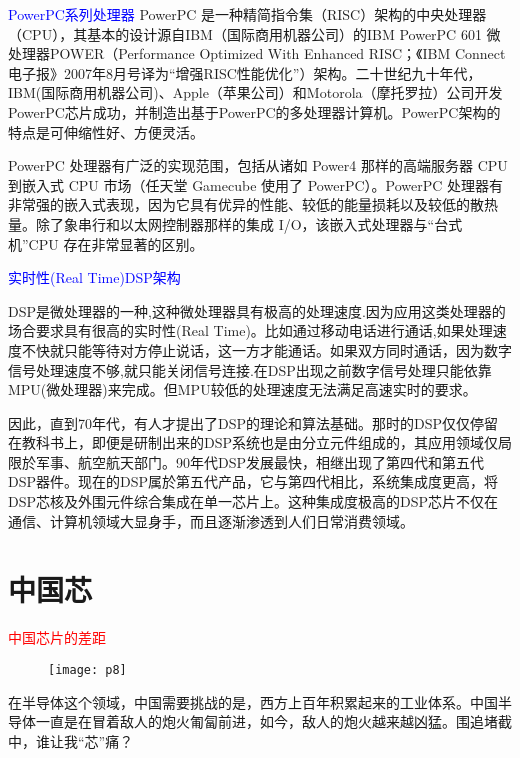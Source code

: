 \documentclass[utf8]{book}
\begin{document}
{\Large \textcolor{blue}{PowerPC系列处理器}}
PowerPC 是一种精简指令集（RISC）架构的中央处理器（CPU），其基本的设计源自IBM（国际商用机器公司）的IBM PowerPC 601 微处理器POWER（Performance Optimized With Enhanced RISC；《IBM Connect 电子报》2007年8月号译为“增强RISC性能优化”）架构。二十世纪九十年代，IBM(国际商用机器公司)、Apple（苹果公司）和Motorola（摩托罗拉）公司开发PowerPC芯片成功，并制造出基于PowerPC的多处理器计算机。PowerPC架构的特点是可伸缩性好、方便灵活。

PowerPC 处理器有广泛的实现范围，包括从诸如 Power4 那样的高端服务器 CPU 到嵌入式 CPU 市场（任天堂 Gamecube 使用了 PowerPC）。PowerPC 处理器有非常强的嵌入式表现，因为它具有优异的性能、较低的能量损耗以及较低的散热量。除了象串行和以太网控制器那样的集成 I/O，该嵌入式处理器与“台式机”CPU 存在非常显著的区别。

{\Large \textcolor{blue}{实时性(Real Time)DSP架构}}

DSP是微处理器的一种,这种微处理器具有极高的处理速度.因为应用这类处理器的场合要求具有很高的实时性(Real Time)。比如通过移动电话进行通话,如果处理速度不快就只能等待对方停止说话，这一方才能通话。如果双方同时通话，因为数字信号处理速度不够,就只能关闭信号连接.在DSP出现之前数字信号处理只能依靠MPU(微处理器)来完成。但MPU较低的处理速度无法满足高速实时的要求。

因此，直到70年代，有人才提出了DSP的理论和算法基础。那时的DSP仅仅停留在教科书上，即便是研制出来的DSP系统也是由分立元件组成的，其应用领域仅局限於军事、航空航天部门。90年代DSP发展最快，相继出现了第四代和第五代DSP器件。现在的DSP属於第五代产品，它与第四代相比，系统集成度更高，将DSP芯核及外围元件综合集成在单一芯片上。这种集成度极高的DSP芯片不仅在通信、计算机领域大显身手，而且逐渐渗透到人们日常消费领域。



\section{中国芯}


\begin{center}
	{\LARGE \textcolor{red}{中国芯片的差距}}
\end{center}


	\begin{figure}[H]
	\centering
	\texttt{[image: p8]}
	\end{figure}

	在半导体这个领域，中国需要挑战的是，西方上百年积累起来的工业体系。中国半导体一直是在冒着敌人的炮火匍匐前进，如今，敌人的炮火越来越凶猛。围追堵截中，谁让我“芯”痛？
\end{document}

